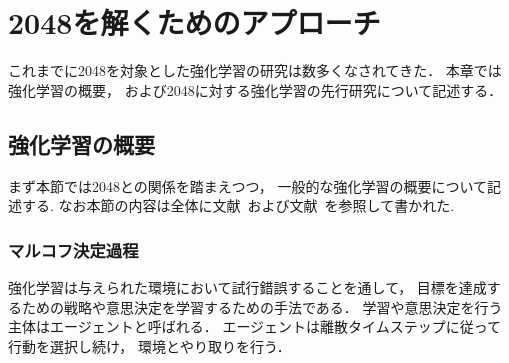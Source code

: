 \chapter{2048を解くためのアプローチ}
\label{chap:rl}
これまでに2048を対象とした強化学習の研究は数多くなされてきた． 
本章では強化学習の概要， および2048に対する強化学習の先行研究について記述する．

\section{強化学習の概要}
\label{sec:rl_general}
まず本節では2048との関係を踏まえつつ， 一般的な強化学習の概要について記述する.
なお本節の内容は全体に文献~\cite{Sutton1998}および文献~\cite{deepRL}を参照して書かれた.

\subsection{マルコフ決定過程}
\label{subsec:mdp}
強化学習は与えられた環境において試行錯誤することを通して， 目標を達成するための戦略や意思決定を学習するための手法である．
学習や意思決定を行う主体はエージェントと呼ばれる．
エージェントは離散タイムステップに従って行動を選択し続け， 環境とやり取りを行う．

